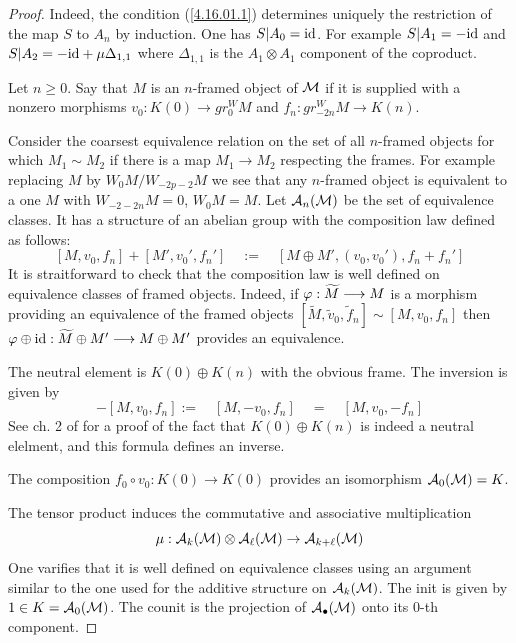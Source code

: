 \documentclass[10pt]{article}
\begin{document}
\begin{proof} Indeed, the condition (\ref{4.16.01.1}) determines uniquely the restriction of the map 
$S$ to $A_n$ by induction. One has $S|A_0 = {\rm id}$. For example 
$S|A_1 = -{\rm id}$ and  $S|A_2 = -{\rm id} + \mu \Delta_{1,1}$ 
where $\Delta_{1,1}$ is the 
$A_1 \otimes A_1$ component of the coproduct. 

Let $n \geq 0$. Say
that   $M$ is an $n$-framed  object of ${\cal M}$  if it is supplied with a 
nonzero morphisms $v_{0} : K(0) \longrightarrow 
gr^W_{0}M$ and   $f_{n}: gr^W_{-2n} M \longrightarrow K(n)$.  

Consider the  coarsest equivalence
relation on the set of all $n$-framed  objects for which $M_1 \sim M_2$
if there is a map $ M_1 \to  M_2$ respecting the frames.  For example 
replacing $M$ by 
$W_0M/W_{-2p-2}M$ we see that any $n$-framed
 object is equivalent to a one $ M$ with $W_{-2-2n} M = 0$, $W_{0} M= M$.
Let ${\cal A}_n({\cal M})$ be the set of equivalence classes.
It  has a structure of an abelian group  
with the composition law defined as follows:
$$
[ M, v_{0},f_{n}] + [ M', v_{0}',f_{n}'] \quad := \quad [M \oplus M', (v_{0}, 
v_{0}'), f_{n} + f_{n}' ]
$$
It is straitforward to check that the composition law is well 
defined on equivalence classes of framed objects. Indeed, if 
$\varphi: \widetilde M \longrightarrow M$ 
is a morphism providing an equivalence of the framed objects 
$[ \widetilde M, \widetilde v_{0}, \widetilde f_{n}] \sim 
[ M, v_{0}, f_{n}]$ then 
$ \varphi \oplus {\rm id}: \widetilde M \oplus M' \longrightarrow M \oplus M'$ 
provides an equivalence. 

The neutral element is $K(0) \oplus K(n)$ with the obvious frame. 
The inversion is given by 
$$
-[M, v_{0}, f_{n}]:= \quad [M, -v_{0}, f_{n}] \quad = \quad [M, v_{0}, -f_{n}]
$$
See ch. 2 of \cite{G9} for a proof of the fact that $K(0) \oplus K(n)$ is 
indeed a neutral elelment, and  this formula defines an 
inverse. 

 
The composition $f_0\circ v_0: K(0) \to K(0)$ provides an 
isomorphism ${\cal A}_0({\cal M}) = K$. 

The tensor product   induces the commutative and associative multiplication
$$
\mu: {\cal  A}_{k}({\cal M}) \otimes {\cal  A}_{\ell}({\cal M})\to {\cal A}_{k+ \ell}({\cal M})
$$
One varifies that it is well defined on equivalence classes using an argument similar 
to the one used for the additive structure on ${\cal  A}_{k}({\cal M})$. 
The init is given by $1 \in K = {\cal A}_0({\cal M})$. 
The counit is the projection of ${\cal  A}_{\bullet}({\cal M})$ 
onto its $0$-th component. 


\end{proof}
\end{document}
